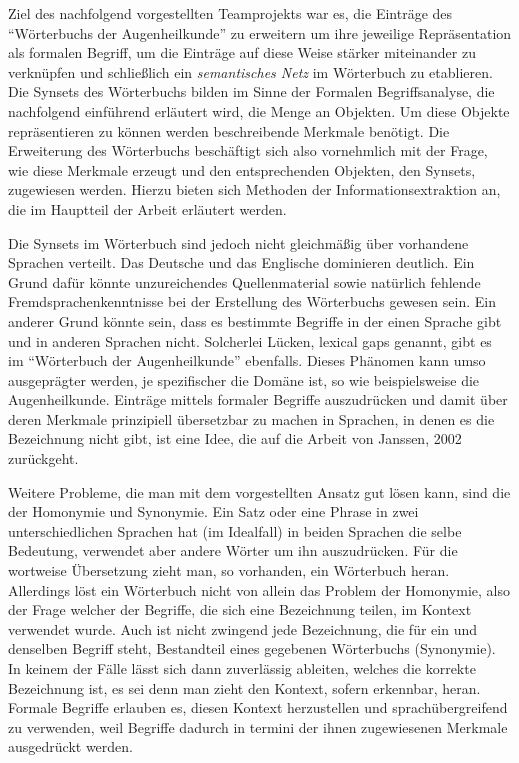 \documentclass[pagesize,paper=A4,DIV=calc,fontsize=12pt,draft=false]{scrreprt}
\begin{document}
Ziel des nachfolgend vorgestellten Teamprojekts war es, die Einträge des \enquote{Wörterbuchs der Augenheilkunde} zu erweitern um ihre jeweilige Repräsentation als formalen Begriff, um die Einträge auf diese Weise stärker miteinander zu verknüpfen und schließlich ein \emph{semantisches Netz} im Wörterbuch zu etablieren. 
Die Synsets des Wörterbuchs bilden im Sinne der Formalen Begriffsanalyse, die nachfolgend einführend erläutert wird, die Menge an Objekten. 
Um diese Objekte repräsentieren zu können werden beschreibende Merkmale benötigt. 
Die Erweiterung des Wörterbuchs beschäftigt sich also vornehmlich mit der Frage, wie diese Merkmale erzeugt und den entsprechenden Objekten, den Synsets, zugewiesen werden. 
Hierzu bieten sich Methoden der Informationsextraktion an, die im Hauptteil der Arbeit erläutert werden. 

Die Synsets im Wörterbuch sind jedoch nicht gleichmäßig über vorhandene Sprachen verteilt. 
Das Deutsche und das Englische dominieren deutlich. 
Ein Grund dafür könnte unzureichendes Quellenmaterial sowie natürlich fehlende Fremdsprachenkenntnisse bei der Erstellung des Wörterbuchs gewesen sein. 
Ein anderer Grund könnte sein, dass es bestimmte Begriffe in der einen Sprache gibt und in anderen Sprachen nicht. 
Solcherlei Lücken, lexical gaps genannt, gibt es im \enquote{Wörterbuch der Augenheilkunde} ebenfalls. 
Dieses Phänomen kann umso ausgeprägter werden, je spezifischer die Domäne ist, so wie beispielsweise die Augenheilkunde. 
Einträge mittels formaler Begriffe auszudrücken und damit über deren Merkmale prinzipiell übersetzbar zu machen in Sprachen, in denen es die Bezeichnung nicht gibt, ist eine Idee, die auf die Arbeit von Janssen, 2002 zurückgeht. 

Weitere Probleme, die man mit dem vorgestellten Ansatz gut lösen kann, sind die der Homonymie und Synonymie. 
Ein Satz oder eine Phrase in zwei unterschiedlichen Sprachen hat (im Idealfall) in beiden Sprachen die selbe Bedeutung, verwendet aber andere Wörter um ihn auszudrücken. 
Für die wortweise Übersetzung zieht man, so vorhanden, ein Wörterbuch heran. 
Allerdings löst ein Wörterbuch nicht von allein das Problem der Homonymie, also der Frage welcher der Begriffe, die sich eine Bezeichnung teilen, im Kontext verwendet wurde. 
Auch ist nicht zwingend jede Bezeichnung, die für ein und denselben Begriff steht, Bestandteil eines gegebenen Wörterbuchs (Synonymie). 
In keinem der Fälle lässt sich dann zuverlässig ableiten, welches die korrekte Bezeichnung ist, es sei denn man zieht den Kontext, sofern erkennbar, heran. 
Formale Begriffe erlauben es, diesen Kontext herzustellen und sprachübergreifend zu verwenden, weil Begriffe dadurch in termini der ihnen zugewiesenen Merkmale ausgedrückt werden. 
\end{document}

